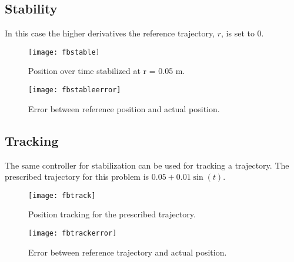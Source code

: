 \documentclass{article}
\begin{document}
\subsection{Stability}
In this case the higher derivatives the reference trajectory, $r$, is set to 0.
\begin{figure}[H]
    \centering
    \texttt{[image: fbstable]}
    \caption{Position over time stabilized at r = 0.05 m.}
\end{figure}
\begin{figure}[H]
    \centering
    \texttt{[image: fbstableerror]}
    \caption{Error between reference position and actual position.}
\end{figure}

\subsection{Tracking}
The same controller for stabilization can be used for tracking a trajectory. The prescribed trajectory for this problem is $0.05 + 0.01\sin(t)$.
\begin{figure}[H]
    \centering
    \texttt{[image: fbtrack]}
    \caption{Position tracking for the prescribed trajectory.}
\end{figure}
\begin{figure}[H]
    \centering
    \texttt{[image: fbtrackerror]}
    \caption{Error between reference trajectory and actual position.}
\end{figure}
\end{document}
